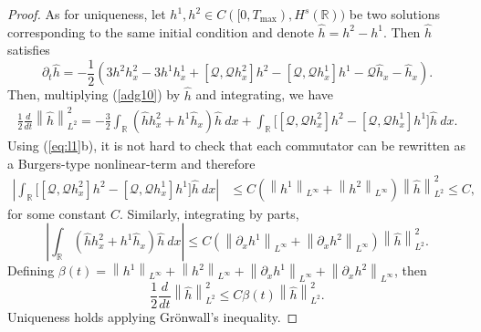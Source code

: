 \documentclass[final,11pt,a4paper,reqno]{amsart}
\newcommand{\norm}[1]{\left\| #1 \right\|}
\newcommand{\av}[1]{\left| #1 \right|}
\newcommand{\RR}{\mathbb R}
\newcommand{\pa}{\partial}
\theoremstyle{definition}
\begin{document}
\begin{proof}
As for uniqueness, let $h^{1},h^{2}\in C([0,T_{\max}),H^{s}(\RR))$ be two solutions corresponding to the same initial condition and denote $\widehat{h}=h^{2}-h^{1}$. Then $\widehat{h}$ satisfies
\begin{equation}\label{adg10}
\pa_{t}\widehat{h}=-\frac{1}{2}\left(3 h^{2}h^{2}_{x}-3 h^{1}h^{1}_{x}+[\mathscr{Q},\mathscr{Q}h^{2}_{x}]h^{2}-[\mathscr{Q},\mathscr{Q}h^{1}_{x}]h^{1} - \mathscr{Q}\widehat{h}_{x}-\widehat{h}_{x}  \right).
\end{equation}
Then, multiplying (\ref{adg10}) by  $\widehat{h}$ and integrating,
we have
\begin{align*}
\frac{1}{2}\frac{d}{dt}\norm{\widehat{h}}_{L^{2}}^{2}=-\frac{3}{2} \int_{\RR} \left( \widehat{h}h^{2}_{x}+h^{1}\widehat{h}_{x}\right) \widehat{h} \ dx+ \int_{\RR} \bigg[ [\mathscr{Q},\mathscr{Q}h^{2}_{x}]h^{2}-[\mathscr{Q},\mathscr{Q}h^{1}_{x}]h^{1}\bigg] \widehat{h} \  dx.
\end{align*}
Using (\ref{eq:l1}b), it is not hard to check that each commutator can be rewritten as a Burgers-type nonlinear-term and therefore
\begin{align*}
 \av{\int_{\RR} \bigg[ [\mathscr{Q},\mathscr{Q}h^{2}_{x}]h^{2}-[\mathscr{Q},\mathscr{Q}h^{1}_{x}]h^{1}\bigg] \widehat{h} \  dx } &\leq C \left( \norm{h^{1}}_{L^{\infty}}+\norm{h^{2}}_{L^{\infty}}\right)\norm{\widehat{h}}_{L^{2}}^{2}\leq C,
 \end{align*}
for some constant $C$.
Similarly, integrating by parts, 
\[ \av{\int_{\RR} \left( \widehat{h}h^{2}_{x}+h^{1}\widehat{h}_{x}\right) \widehat{h} \ dx } \leq C \left( \norm{\pa_{x}h^{1}}_{L^{\infty}}+\norm{\pa_{x}h^{2}}_{L^{\infty}}\right)\norm{\widehat{h}}_{L^{2}}^{2}.\]
Defining $\beta(t)=\norm{h^{1}}_{L^{\infty}}+\norm{h^{2}}_{L^{\infty}}+\norm{\pa_{x}h^{1}}_{L^{\infty}}+\norm{\pa_{x}h^{2}}_{L^{\infty}}$, then
\[\frac{1}{2}\frac{d}{dt}\norm{\widehat{h}}_{L^{2}}^{2} \leq C \beta(t)\norm{\widehat{h}}_{L^{2}}^{2}. \] 
Uniqueness holds applying Gr\"onwall's inequality.
\end{proof}
\end{document}

